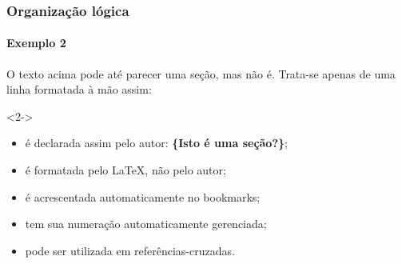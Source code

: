 \documentclass[handout]{beamer}
\begin{document}
\begin{frame}[fragile]
	\frametitle{Organização lógica}
	\framesubtitle{Exemplo 2}
	
	\vspace{.5cm}\par	
	
	O texto acima pode até parecer uma seção, mas não é. Trata-se apenas de uma linha formatada à mão assim:
	\begin{uncoverenv}<2->
		\begin{LaTeXcode}	
		\vspace{.5cm}
		\vspace{.5cm}\par
		\end{LaTeXcode}	
	\end{uncoverenv}
	
	\begin{itemize}
		\item<3-> é declarada assim pelo autor: {\bfseries{}\{Isto é uma seção?\}};
		\item<4-> é formatada pelo \LaTeX, não pelo autor;
		\item<5-> é acrescentada automaticamente no bookmarks;
		\item<6-> tem sua numeração automaticamente gerenciada;
		\item<7-> pode ser utilizada em referências-cruzadas.
	\end{itemize}	
\end{frame}

\end{document}
